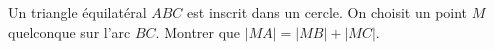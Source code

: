 Un triangle équilatéral $ABC$ est inscrit dans un cercle. On choisit un point $M$ quelconque sur l'arc $BC$. Montrer que $|MA| = |MB| + |MC|$.
